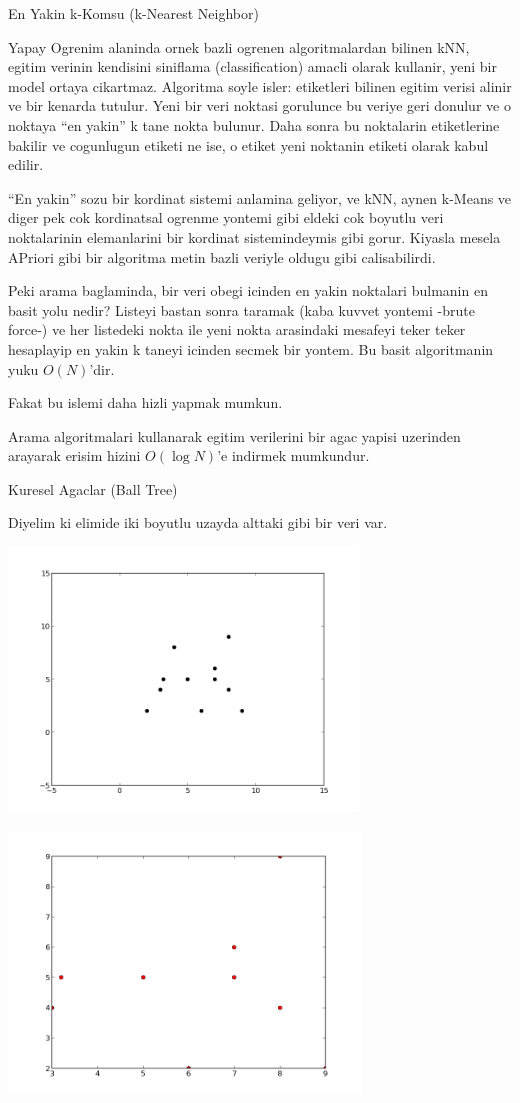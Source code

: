 \documentclass[12pt,fleqn]{article}\usepackage{../common}
\begin{document}
En Yakin k-Komsu (k-Nearest Neighbor)

Yapay Ogrenim alaninda ornek bazli ogrenen algoritmalardan bilinen kNN,
egitim verinin kendisini siniflama (classification) amacli olarak kullanir,
yeni bir model ortaya cikartmaz. Algoritma soyle isler: etiketleri bilinen
egitim verisi alinir ve bir kenarda tutulur. Yeni bir veri noktasi
gorulunce bu veriye geri donulur ve o noktaya ``en yakin'' k tane nokta
bulunur. Daha sonra bu noktalarin etiketlerine bakilir ve cogunlugun
etiketi ne ise, o etiket yeni noktanin etiketi olarak kabul edilir.

``En yakin'' sozu bir kordinat sistemi anlamina geliyor, ve kNN, aynen
k-Means ve diger pek cok kordinatsal ogrenme yontemi gibi eldeki cok
boyutlu veri noktalarinin elemanlarini bir kordinat sistemindeymis gibi
gorur. Kiyasla mesela APriori gibi bir algoritma metin bazli veriyle oldugu
gibi calisabilirdi.

Peki arama baglaminda, bir veri obegi icinden en yakin noktalari bulmanin
en basit yolu nedir? Listeyi bastan sonra taramak (kaba kuvvet yontemi
-brute force-) ve her listedeki nokta ile yeni nokta arasindaki mesafeyi
teker teker hesaplayip en yakin k taneyi icinden secmek bir yontem. Bu
basit algoritmanin yuku $O(N)$'dir. 

Fakat bu islemi daha hizli yapmak mumkun. 

Arama algoritmalari kullanarak egitim verilerini bir agac yapisi uzerinden
arayarak erisim hizini $O(\log N)$'e indirmek mumkundur. 

Kuresel Agaclar (Ball Tree) 

Diyelim ki elimide iki boyutlu uzayda alttaki gibi bir veri var. 

\includegraphics[height=7cm]{knn-main.png}


\includegraphics[height=7cm]{knn0.png}
\end{document}

